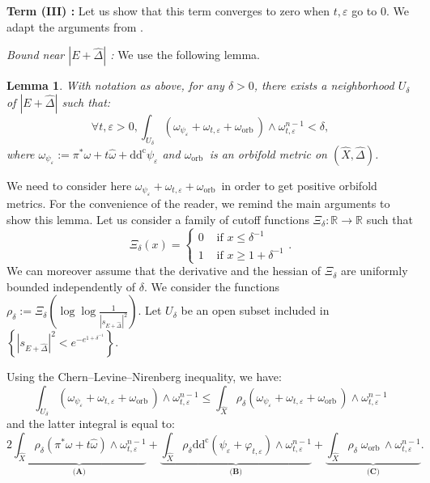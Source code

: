 \documentclass[12pt,a4paper]{amsart}
\newcommand{\R}{\mathbb{R}}
\newcommand{\orb}{\mathrm{orb}\,}
\newcommand{\ddc}{\mathrm{dd^c}}
\theoremstyle{plain}
\newtheorem{lemm}[theo]{Lemma}
\theoremstyle{definition}
\begin{document}
\textbf{Term (III) :} Let us show that this term converges to zero when $t, \varepsilon$ go to 0. We adapt the arguments from \cite[Term I~-~Sect.2.2]{DGP24}.

\emph{Bound near $|E + \widehat{\Delta}|$ :} We use the following lemma.

\begin{lemm}\label{Bound near the divisor}
    With notation as above, for any $\delta > 0$, there exists a neighborhood $U_\delta$ of $|E + \widehat{\Delta}|$ such that:
    $$
    \forall t, \varepsilon > 0, \int_{U_\delta} (\omega_{\psi_\varepsilon} + \omega_{t, \varepsilon} + \omega_\orb) \wedge \omega_{t, \varepsilon}^{n-1} < \delta,
    $$
    where $\omega_{\psi_\varepsilon} := \pi^*\omega + t \widehat{\omega} + \ddc \psi_\varepsilon$ and $\omega_\orb$ is an orbifold metric on $(\widehat{X}, \widehat{\Delta})$.
\end{lemm}
We need to consider here $\omega_{\psi_\varepsilon} + \omega_{t, \varepsilon} + \omega_\orb$ in order to get positive orbifold metrics. For the convenience of the reader, we remind the main arguments to show this lemma. Let us consider a family of cutoff functions $\Xi_\delta: \R \longrightarrow \R$ such that
$$
\Xi_\delta(x) =
\left\lbrace 
\begin{array}{cc}
     0 & \text{ if } x \leq \delta^{-1} \\
     1 & \text{ if } x \geq 1 + \delta^{-1}
\end{array}
\right.
.
$$
We can moreover assume that the derivative and the hessian of $\Xi_\delta$ are uniformly bounded independently of $\delta$. We consider the functions $\rho_\delta := \Xi_\delta \left( \log \log \frac{1}{|s_{E + \widehat{\Delta}}|^2} \right)$. Let $U_\delta$ be an open subset included in $\left\lbrace |s_{E + \widehat{\Delta}}|^2 < e^{-e^{1 + \delta^{-1}}} \right\rbrace$.

Using the Chern--Levine--Nirenberg inequality, we have:
\begin{equation}
    \int_{U_\delta} \left( \omega_{\psi_\varepsilon} + \omega_{t, \varepsilon} + \omega_\orb \right) \wedge \omega_{t, \varepsilon}^{n-1} \leq \int_{\widehat{X}} \rho_\delta \left( \omega_{\psi_\varepsilon} + \omega_{t, \varepsilon} + \omega_\orb \right) \wedge \omega_{t, \varepsilon}^{n-1}
\end{equation}
and the latter integral is equal to:
\begin{equation}
    2\underbrace{\int_{\widehat{X}} \rho_\delta  \left( \pi^*\omega + t \widehat{\omega} \right) \wedge \omega_{t, \varepsilon}^{n-1}}_{\textbf{(A)}} + \underbrace{\int_{\widehat{X}} \rho_\delta \ddc \left( \psi_\varepsilon + \varphi_{t, \varepsilon} \right) \wedge \omega_{t, \varepsilon}^{n-1}}_{\textbf{(B)}} + \underbrace{\int_{\widehat{X}} \rho_\delta \; \omega_\orb \wedge \omega_{t, \varepsilon}^{n-1}}_{\textbf{(C)}}.
\end{equation}
\end{document}
